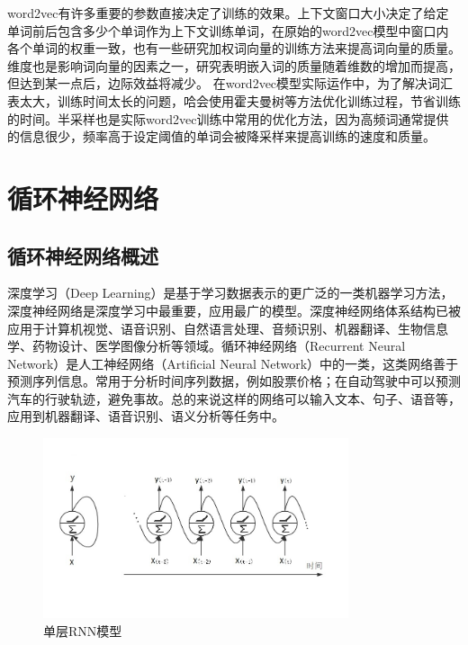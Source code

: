 \documentclass[winfonts,master,oneside,nobackinfo]{njuthesis}
\begin{document}
word2vec有许多重要的参数直接决定了训练的效果。上下文窗口大小决定了给定单词前后包含多少个单词作为上下文训练单词，在原始的word2vec模型中窗口内各个单词的权重一致，也有一些研究加权词向量的训练方法\cite{myh}来提高词向量的质量。维度也是影响词向量的因素之一，研究表明嵌入词的质量随着维数的增加而提高，但达到某一点后，边际效益将减少\cite{Mikolov}。
在word2vec模型实际运作中，为了解决词汇表太大，训练时间太长的问题，哈会使用霍夫曼树等方法优化训练过程，节省训练的时间。半采样也是实际word2vec训练中常用的优化方法，因为高频词通常提供的信息很少，频率高于设定阈值的单词会被降采样来提高训练的速度和质量。

\section{循环神经网络}

\subsection{循环神经网络概述}

深度学习（Deep Learning）是基于学习数据表示的更广泛的一类机器学习方法，深度神经网络是深度学习中最重要，应用最广的模型。深度神经网络体系结构已被应用于计算机视觉、语音识别、自然语言处理、音频识别、机器翻译、生物信息学、药物设计、医学图像分析等领域。循环神经网络（Recurrent Neural Network）是人工神经网络（Artificial Neural Network）中的一类，这类网络善于预测序列信息。常用于分析时间序列数据，例如股票价格；在自动驾驶中可以预测汽车的行驶轨迹，避免事故。总的来说这样的网络可以输入文本、句子、语音等，应用到机器翻译、语音识别、语义分析等任务中。

\begin{figure}[ht]
\centering
\begin{minipage}[t]{1\textwidth}
\centering
\includegraphics[width=0.8\textwidth]{./figure/RNN.jpg}
\caption{单层RNN模型}
\label{lab:1}
\end{minipage}
\end{figure}
\end{document}
